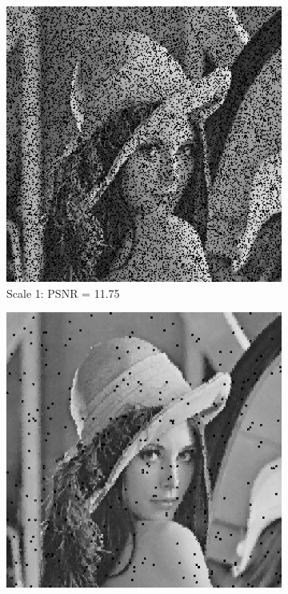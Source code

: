 \begin{figure}
\centering
  \begin{subfigure}{0.4\textwidth}
    \includegraphics[width=\textwidth]{Chapter5/Images/lenna_haar1.png}
    \caption{Scale 1: PSNR = 11.75}
  \end{subfigure}
  \begin{subfigure}{0.4\textwidth}
    \includegraphics[width=\textwidth]{Chapter5/Images/lenna_haar2.png}

\end{subfigure}
\end{figure}
